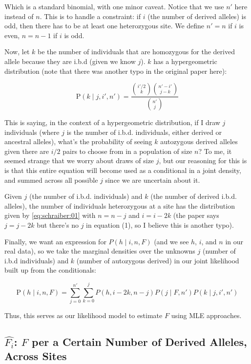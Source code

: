 \documentclass[12pt]{article}\usepackage[]{graphicx}\usepackage[]{color}
\begin{document}
Which is a standard binomial, with one minor caveat. Notice that we
use $n'$ here instead of $n$. This is to handle a constraint: if $i$
(the number of derived alleles) is odd, then there has to be at least
one heterozygous site. We define $n' = n$ if $i$ is even, $n = n - 1$
if $i$ is odd.

Now, let $k$ be the number of individuals that are homozygous for the
derived allele because they are i.b.d (given we know $j$). $k$ has a
hypergeometric distribution (note that there was another typo in the
original paper here):

\begin{equation} \label{eq:schraiber:03}
\text{P}(k \mid j, i', n') = \frac{  {i'/2 \choose k} { n' - i' \choose j - k } } { {n' \choose j}}
\end{equation}

This is saying, in the context of a hypergeometric distribution, if I
draw $j$ individuals (where $j$ is the number of i.b.d. individuals,
either derived or ancestral alleles), what's the probability of seeing
$k$ autozygous derived alleles given there are $i/2$ pairs to choose
from in a population of size $n$? To me, it seemed strange that we
worry about draws of size $j$, but our reasoning for this is is that
this entire equation will become used as a conditional in a joint
density, and summed across all possible $j$ since we are uncertain
about it.

Given $j$ (the number of i.b.d. individuals) and $k$ (the number of
derived i.b.d. alleles), the number of individuals heterozygous at a
site has the distribution given by \autoref{eq:schraiber:01} with $n =
n - j$ and $i = i - 2k$ (the paper says $j = j - 2k$ but there's no
$j$ in equation (1), so I believe this is another typo). 

Finally, we want an expression for $P(h \mid i, n, F)$ (and we see
$h$, $i$, and $n$ in our real data), so we take the marginal densities
over the unknowns $j$ (number of i.b.d individuals) and $k$ (number of
autozygous derived) in our joint likelihood built up from the
conditionals:

\begin{equation} \label{eq:schraiber:04}
\text{P}(h \mid i, n, F) = \sum_{j=0}^{n'}\sum_{k=0}^{j} P(h, i - 2k, n - j) P(j \mid F, n') P(k \mid j, i', n')
\end{equation}

Thus, this serves as our likelihood model to estimate $F$ using MLE
approaches.

\subsection{$\hat{F_i}$: $F$ per a Certain Number of Derived Alleles, Across Sites}
\end{document}
